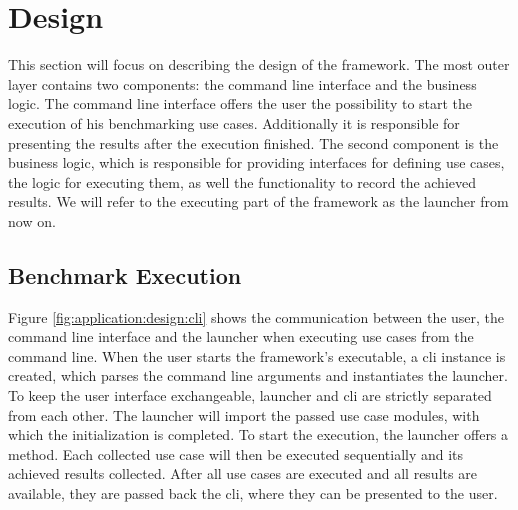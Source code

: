 
\section{Design}

\label{sec:application:design}

This section will focus on describing the design of the framework. The most
outer layer contains two components: the command line interface and the business
logic. The command line interface offers the user the possibility to start the
execution of his benchmarking use cases. Additionally it is responsible for
presenting the results after the execution finished. The second component is the
business logic, which is responsible for providing interfaces for defining use
cases, the logic for executing them, as well the functionality to record the
achieved results. We will refer to the executing part of the framework as the
launcher from now on.

\subsection{Benchmark Execution}

Figure \ref{fig:application:design:cli} shows the communication between the
user, the command line interface and the launcher when executing use cases from
the command line.  When the user starts the framework's executable, a \gls{cli}
instance is created, which parses the command line arguments and instantiates
the launcher. To keep the user interface exchangeable, launcher and \gls{cli}
are strictly separated from each other. The launcher will import the passed use
case modules, with which the initialization is completed. To start the
execution, the launcher offers a  method. Each
collected use case will then be executed sequentially and its achieved results
collected. After all use cases are executed and all results are available, they
are passed back the \gls{cli}, where they can be presented to the user.

